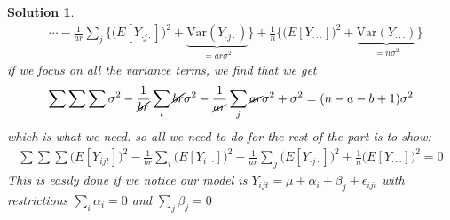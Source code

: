 \documentclass[11pt]{article}
\newtheorem{sol}{Solution}
\begin{document}
\begin{sol}
\begin{align*}
		&\cdots - \frac{1}{ar}\sum_j\Big\{\Big(E[Y_{\cdot j\cdot}]\Big)^2 + \underbrace{\text{Var}(Y_{\cdot j\cdot})}_{= ar\sigma^2}\Big\} + \frac{1}{n}\Big\{\Big(E[Y_{\cdot\cdot\cdot}]\Big)^2 + \underbrace{\text{Var}(Y_{\cdot\cdot\cdot})}_{= n\sigma^2}\Big\}
	\end{align*}
	if we focus on all the variance terms, we find that we get
	\begin{align*}
	\sum\sum\sum \sigma^2 - \frac{1}{\cancel{br}}\sum_i \cancel{br}\sigma^2 - \frac{1}{\cancel{ar}}\sum_j \cancel{ar}\sigma^2 + \sigma^2 = (n-a-b + 1)\sigma^2
	\end{align*}
	which is what we need. so all we need to do for the rest of the part is to show:
	\begin{align*}
		\sum\sum\sum\Big(E[Y_{ijt}]\Big)^2 - \frac{1}{br}\sum_i\Big(E[Y_{i\cdot\cdot}]\Big)^2 - \frac{1}{ar}\sum_j\Big(E[Y_{\cdot j\cdot}]\Big)^2 + \frac{1}{n}\Big(E[Y_{\cdot\cdot\cdot}]\Big)^2 = 0
	\end{align*}
	This is easily done if we notice our model is $Y_{ijt} = \mu + \alpha_i + \beta_j + \epsilon_{ijt}$ with restrictions $\sum_i\alpha_i = 0$ and $\sum_j\beta_j = 0$
\end{sol}
\end{document}

